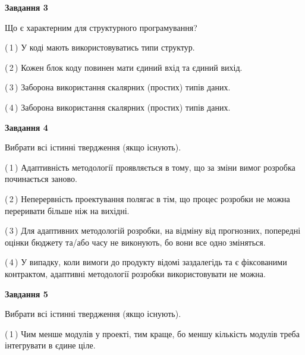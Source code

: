 \documentclass[10pt, ukrainian]{article}
\begin{document}
{\begin {large}
{\begin {center}\textbf{Завдання 3}\end {center}}\par
Що є характерним для структурного програмування?\par
\vspace{2mm}



(\,1\,) У коді мають використовуватись типи структур. %



(\,2\,) Кожен блок коду повинен мати єдиний вхід та єдиний вихід.%



(\,3\,) Заборона використання скалярних (простих) типів даних. %



(\,4\,) Заборона використання скалярних (простих) типів даних. %


{\begin {center}\textbf{Завдання 4}\end {center}}\par
Вибрати всі істинні твердження (якщо існують).\par
\vspace{2mm}



(\,1\,) Адаптивність методології проявляється в тому, що за зміни вимог розробка починається заново. %



(\,2\,) Неперервність проектування полягає в тім, що процес розробки не можна переривати більше ніж на вихідні. %



(\,3\,) Для адаптивних методологій розробки, на відміну від прогнозних, попередні оцінки бюджету та/або часу не виконують, бо вони все одно зміняться. %



(\,4\,) У випадку, коли вимоги до продукту відомі заздалегідь та є фіксованими контрактом, адаптивні методології розробки використовувати не можна. %


{\begin {center}\textbf{Завдання 5}\end {center}}\par
Вибрати всі істинні твердження (якщо існують).\par
\vspace{2mm}



(\,1\,) Чим менше модулів у проекті, тим краще, бо меншу кількість модулів треба інтегрувати в єдине ціле. %




\end{large}}
\end{document}
